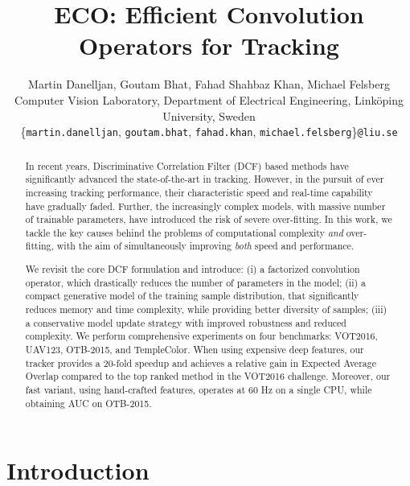 \documentclass[10pt,twocolumn,letterpaper]{article}
\begin{document}
\title{ECO: Efficient Convolution Operators for Tracking}

\author{Martin Danelljan, Goutam Bhat, Fahad Shahbaz Khan, Michael Felsberg \\
	\small Computer Vision Laboratory, Department of Electrical Engineering, Link\"oping University, Sweden\\
	\small\{\texttt{martin.danelljan},\; \texttt{goutam.bhat},\; \texttt{fahad.khan},\; \texttt{michael.felsberg}\}\texttt{@liu.se}
	{}
}

\maketitle


\begin{abstract}
   In recent years, Discriminative Correlation Filter (DCF) based methods have significantly advanced the state-of-the-art in tracking. However, in the pursuit of ever increasing tracking performance, their characteristic speed and real-time capability have gradually faded. Further, the increasingly complex models, with massive number of trainable parameters, have introduced the risk of severe over-fitting. In this work, we tackle the key causes behind the problems of computational complexity \emph{and} over-fitting, with the aim of simultaneously improving \emph{both} speed and performance.

We revisit the core DCF formulation and introduce: (i) a factorized convolution operator, which drastically reduces the number of parameters in the model; (ii) a compact generative model of the training sample distribution, that significantly reduces memory and time complexity, while providing better diversity of samples; (iii) a conservative model update strategy with improved robustness and reduced complexity. We perform comprehensive experiments on four benchmarks: VOT2016, UAV123, OTB-2015, and TempleColor.
When using expensive deep features, our tracker provides a 20-fold speedup and achieves a  relative gain in Expected Average Overlap compared to the top ranked method \cite{DanelljanECCV2016} in the VOT2016 challenge. Moreover, our fast variant, using hand-crafted features, operates at 60 Hz on a single CPU, while obtaining  AUC on OTB-2015. \end{abstract}



\section{Introduction}
\end{document}
